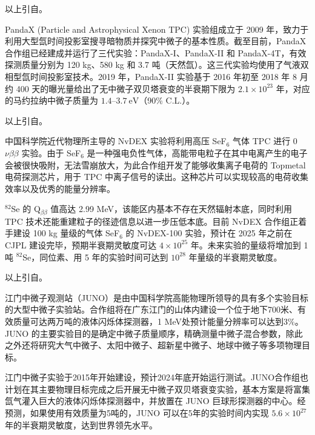 \documentclass[type=master]{fduthesis}
\begin{document}
{\color{red} 以上引自}\cite{Wang2025}。 





PandaX (Particle and Astrophysical Xenon TPC) 实验组成立于 2009 年，致力于利用大型氙时间投影室搜寻暗物质并探究中微子的基本性质。截至目前，PandaX 合作组已经建成并运行了三代实验：PandaX-I、PandaX-II 和 PandaX-4T，有效探测质量分别为 120 kg、580 kg 和 3.7 吨（天然氙）。这三代实验均使用了气液双相型氙时间投影室技术。2019 年，PandaX-II 实验基于 2016 年初至 2018 年 8 月约 400 天的曝光量给出了无中微子双贝塔衰变的半衰期下限为 $2.1\times 10^{23}$ 年，对应的马约拉纳中微子质量为 $1.4\text{--}3.7~\mathrm{eV}$（90\% C.L.）\cite{Ni2019}。

{\color{red} 以上引自}\cite{Wang2025}。 





中国科学院近代物理所主导的 NvDEX 实验将利用高压 SeF$_6$ 气体 TPC 进行 0$\nu\beta\beta$ 实验。由于 SeF$_6$ 是一种强电负性气体，高能带电粒子在其中电离产生的电子会被很快吸附，无法雪崩放大，为此合作组开发了能够收集离子电荷的 Topmetal 电荷探测芯片\cite{An2016}，用于 TPC 中离子信号的读出。这种芯片可以实现较高的电荷收集效率以及优秀的能量分辨率。

$^{82}$Se 的 Q$_{\beta\beta}$ 值高达 2.99 MeV，该能区内基本不存在天然辐射本底，同时利用 TPC 技术还能重建粒子的径迹信息以进一步压低本底。目前 NvDEX 合作组正着手建设 100 kg 量级的气体 SeF$_6$ 的 NvDEX-100 实验，预计在 2025 年之前在 CJPL 建设完毕，预期半衰期灵敏度可达 $4\times 10^{25}$ 年。未来实验的量级将增加到 1 吨 $^{82}$Se，同位素、用 5 年的实验时间可达到 $10^{28}$ 年量级的半衰期灵敏度。

{\color{red} 以上引自}\cite{Wang2025}。 





江门中微子观测站（JUNO）是由中国科学院高能物理所领导的具有多个实验目标的大型中微子实验站。合作组将在广东江门的山体内建设一个位于地下700米、有效质量可达两万吨的液体闪烁体探测器，1 MeV处预计能量分辨率可以达到$3\%$。JUNO 的主要实验目的是确定中微子质量顺序，精确测量中微子混合参数，除此之外还将研究大气中微子、太阳中微子、超新星中微子、地球中微子等多项物理目标。

江门中微子实验于2015年开始建设，预计2024年底开始运行测试。JUNO合作组也计划在其主要物理目标完成之后开展无中微子双贝塔衰变实验，基本方案是将富集氙气灌入巨大的液体闪烁体探测器中，并放置在 JUNO 巨球形探测器的中心。经预测，如果使用有效质量为5吨的，JUNO 可以在5年的实验时间内实现 $5.6\times10^{27}$ 年的半衰期灵敏度，达到世界领先水平\cite{Zhao2017}。
\end{document}
